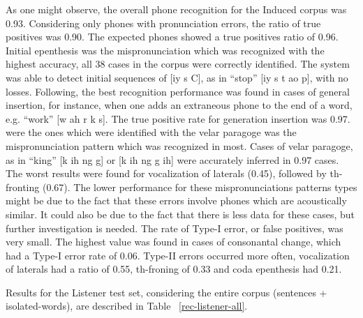 \documentclass[twocolumn]{bmcart}%
\begin{document}
As one might observe, the overall phone recognition for the Induced corpus was 0.93. Considering only phones with pronunciation errors, the ratio of true positives was 0.90. The expected phones showed a true positives ratio of 0.96. Initial epenthesis was the mispronunciation which was recognized with the highest accuracy, all 38 cases in the corpus were correctly identified. The system was able to detect initial sequences of [iy s C], as in ``stop'' [iy s t ao p], with no losses. Following, the best recognition performance was found in cases of general insertion, for instance, when one adds an extraneous phone to the end of a word, e.g. ``work'' [w ah r k s]. The true positive rate for generation insertion was 0.97. were the ones which were identified with the  velar paragoge was the mispronunciation pattern which was recognized in most. Cases of velar paragoge, as in ``king'' [k ih ng g] or [k ih ng g ih] were accurately inferred in 0.97 cases. The worst results were found for vocalization of laterals (0.45), followed by th-fronting (0.67). The lower performance for these mispronunciations patterns types might be due to the fact that these errors involve phones which are acoustically similar. It could also be due to the fact that there is less data for these cases, but further investigation is needed. The rate of Type-I error, or false positives, was very small. The highest value was found in cases of consonantal change, which had a Type-I error rate of 0.06. Type-II errors occurred more often, vocalization of laterals had a ratio of 0.55, th-froning of 0.33 and coda epenthesis had 0.21.

Results for the Listener test set, considering the entire corpus (sentences + isolated-words), are described in Table ~\ref{rec-listener-all}.
\end{document}
